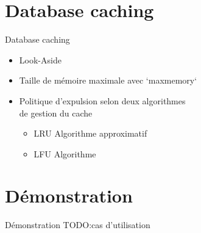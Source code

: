 \documentclass[aspectratio=169]{beamer}
\newcommand{\TODO}{TODO:}
\begin{document}
\section{Database caching}
\begin{frame}{Database caching}
\begin{itemize}
  \item Look-Aside 
  \item Taille de mémoire maximale avec `maxmemory`
  \item Politique d'expulsion selon deux algorithmes \\ de gestion du cache
  \begin{itemize}
    \item LRU Algorithme approximatif
    \item LFU Algorithme
 \end{itemize}
\end{itemize}
\end{frame}

\section{Démonstration}
\begin{frame}{Démonstration}
\TODO cas d'utilisation
\end{frame}
\end{document}
